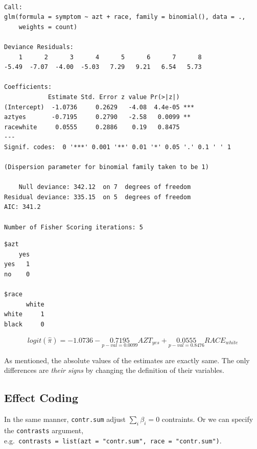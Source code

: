 \documentclass[]{book}
\newenvironment{Shaded}{\begin{snugshade}}{\end{snugshade}}
\newcommand{\NormalTok}[1]{#1}
\newcommand{\OperatorTok}[1]{\textcolor[rgb]{0.81,0.36,0.00}{\textbf{#1}}}
\begin{document}
\begin{verbatim}

Call:
glm(formula = symptom ~ azt + race, family = binomial(), data = ., 
    weights = count)

Deviance Residuals: 
    1      2      3      4      5      6      7      8  
-5.49  -7.07  -4.00  -5.03   7.29   9.21   6.54   5.73  

Coefficients:
            Estimate Std. Error z value Pr(>|z|)    
(Intercept)  -1.0736     0.2629   -4.08  4.4e-05 ***
aztyes       -0.7195     0.2790   -2.58   0.0099 ** 
racewhite     0.0555     0.2886    0.19   0.8475    
---
Signif. codes:  0 '***' 0.001 '**' 0.01 '*' 0.05 '.' 0.1 ' ' 1

(Dispersion parameter for binomial family taken to be 1)

    Null deviance: 342.12  on 7  degrees of freedom
Residual deviance: 335.15  on 5  degrees of freedom
AIC: 341.2

Number of Fisher Scoring iterations: 5
\end{verbatim}

\begin{Shaded}
\end{Shaded}

\begin{verbatim}
$azt
    yes
yes   1
no    0

$race
      white
white     1
black     0
\end{verbatim}

\begin{equation}
logit(\hat\pi) = -1.0736 - \underset{p-val = 0.0099}{0.7195} AZT_{yes} + \underset{p-val = 0.8476}{0.0555} RACE_{white}
\label{eq:dumlastfit}
\end{equation}

As mentioned, the absolute values of the estimates are exactly same. The only differences are \emph{their signs} by changing the definition of their variables.

\hypertarget{effect-coding-1}{%
\subsection{Effect Coding}\label{effect-coding-1}}

In the same manner, \texttt{contr.sum} adjust \(\sum\limits_i \beta_i = 0\) contraints. Or we can specify the \texttt{contrasts} argument, e.g.~\texttt{contrasts\ =\ list(azt\ =\ "contr.sum",\ race\ =\ "contr.sum")}.
\end{document}
